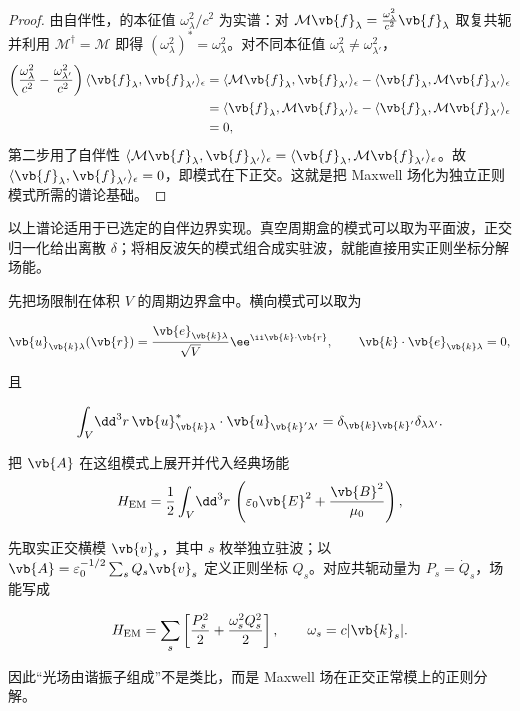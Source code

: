 \begin{proof}
由自伴性，的本征值 \(\omega_\lambda^2/c^2\) 为实谱：对 \(\mathcal M\vb{f}_\lambda=\frac{\omega_\lambda^2}{c^2}\vb{f}_\lambda\) 取复共轭并利用 \(\mathcal M^\dagger=\mathcal M\) 即得 \((\omega_\lambda^2)^*=\omega_\lambda^2\)。对不同本征值 \(\omega_\lambda^2\ne\omega_{\lambda'}^2\)，
\begin{align*}
 \left(\frac{\omega_\lambda^2}{c^2}-\frac{\omega_{\lambda'}^2}{c^2}\right)
 \langle\vb{f}_\lambda,\vb{f}_{\lambda'}\rangle_\epsilon
 &=\langle\mathcal M\vb{f}_\lambda,\vb{f}_{\lambda'}\rangle_\epsilon
 -\langle\vb{f}_\lambda,\mathcal M\vb{f}_{\lambda'}\rangle_\epsilon\\
 &=\langle\vb{f}_\lambda,\mathcal M\vb{f}_{\lambda'}\rangle_\epsilon
 -\langle\vb{f}_\lambda,\mathcal M\vb{f}_{\lambda'}\rangle_\epsilon\\
 &=0,
\end{align*}
第二步用了自伴性 \(\langle\mathcal M\vb{f}_\lambda,\vb{f}_{\lambda'}\rangle_\epsilon=\langle\vb{f}_\lambda,\mathcal M\vb{f}_{\lambda'}\rangle_\epsilon\)。故 \(\langle\vb{f}_\lambda,\vb{f}_{\lambda'}\rangle_\epsilon=0\)，即模式在下正交。这就是把 Maxwell 场化为独立正则模式所需的谱论基础。
\end{proof}

以上谱论适用于已选定的自伴边界实现。真空周期盒的模式可以取为平面波，正交归一化给出离散 $\delta$；将相反波矢的模式组合成实驻波，就能直接用实正则坐标分解场能。

先把场限制在体积 \(V\) 的周期边界盒中。横向模式可以取为

\[
\vb{u}_{\vb{k}\lambda}(\vb{r})
=\frac{\vb{e}_{\vb{k}\lambda}}{\sqrt V}
 \ee^{\ii\vb{k}\cdot\vb{r}},
\qquad
\vb{k}\cdot\vb{e}_{\vb{k}\lambda}=0,
\]

且

\[
\int_V\!\dd^3 r\,
\vb{u}_{\vb{k}\lambda}^*\cdot
\vb{u}_{\vb{k}'\lambda'}
=\delta_{\vb{k}\vb{k}'}\delta_{\lambda\lambda'}.
\]

把 \(\vb{A}\) 在这组模式上展开并代入经典场能
\[
H_{\rm EM}
=\frac12\int_V\!\dd^3 r\,
\left(\varepsilon_0\vb{E}^2+\frac{\vb{B}^2}{\mu_0}\right),
\]

先取实正交横模 $\vb{v}_s$，其中 $s$ 枚举独立驻波；以 $\vb{A}=\varepsilon_0^{-1/2}\sum_sQ_s\vb{v}_s$ 定义正则坐标 $Q_s$。对应共轭动量为 $P_s=\dot Q_s$，场能写成

\[
H_{\rm EM}
=\sum_s
\left[
\frac{P_s^2}{2}
+\frac{\omega_s^2Q_s^2}{2}
\right],
\qquad \omega_s=c|\vb{k}_s|.
\]

因此``光场由谐振子组成''不是类比，而是 Maxwell 场在正交正常模上的正则分解。

